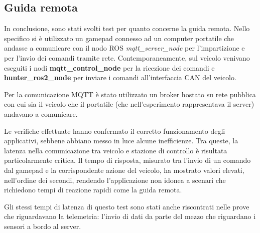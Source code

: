 \subsection{Guida remota}
In conclusione, sono stati svolti test per quanto concerne la guida remota. Nello specifico si è utilizzato un gamepad connesso ad un computer portatile che andasse a comunicare con il nodo ROS \textit{mqtt\_server\_node} per l'impartizione e per l'invio dei comandi tramite rete. Contemporaneamente, sul veicolo venivano eseguiti i nodi \textbf{mqtt\_control\_node} per la ricezione dei comandi e \textbf{hunter\_ros2\_node} per inviare i comandi all'interfaccia CAN del veicolo.

\noindent Per la comunicazione MQTT è stato utilizzato un broker hostato su rete pubblica con cui sia il veicolo che il portatile (che nell'esperimento rappresentava il server) andavano a comunicare. 

\noindent Le verifiche effettuate hanno confermato il corretto funzionamento degli applicativi, sebbene abbiano messo in luce alcune inefficienze. Tra queste, la latenza nella comunicazione tra veicolo e stazione di controllo è risultata particolarmente critica. Il tempo di risposta, misurato tra l'invio di un comando dal gamepad e la corrispondente azione del veicolo, ha mostrato valori elevati, nell'ordine dei secondi, rendendo l'applicazione non idonea a scenari che richiedono tempi di reazione rapidi come la guida remota.

\noindent Gli stessi tempi di latenza di questo test sono stati anche riscontrati nelle prove che riguardavano la telemetria: l'invio di dati da parte del mezzo che riguardano i sensori a bordo al server.
